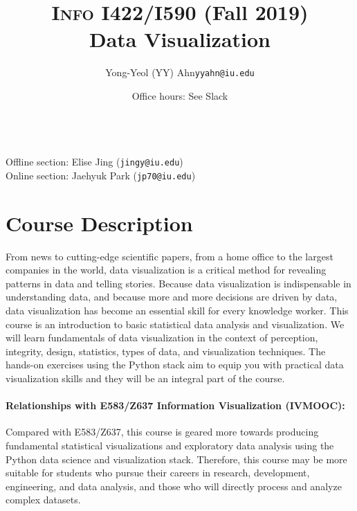 \documentclass[11pt,article,oneside]{memoir} %
\makeatletter
\def\myauthor{Author}
\def\mytitle{Title}
\def\myemail{yyahn@iu.edu}
\def\myauthor{Yong-Yeol (YY) Ahn}
\def\mytitle{{\normalsize \textsc{Info} I422/I590 (Fall 2019)} \\ \HUGE{} Data Visualization}
\makeatother
\begin{document}

\title{\LARGE \mytitle} %
\author{\Large\myauthor\newline \footnotesize\texttt{\noindent\myemail}}

\maketitle 

\vspace{-20pt}{\bfseries Assistant Instructors} \\ %
Offline section: Elise Jing (\texttt{jingy@iu.edu}) \\
Online section: Jaehyuk Park (\texttt{jp70@iu.edu}) \\

\date{Office hours: See Slack}
\section{Course Description}%

From news to cutting-edge scientific papers, from a home office to the largest companies in the world, data visualization is a critical method for revealing patterns in data and telling stories. 
Because data visualization is indispensable in understanding data, and because more and more decisions are driven by data, data visualization has become an essential skill for every knowledge worker.  
This course is an introduction to basic statistical data analysis and visualization.  
We will learn fundamentals of data visualization in the context of perception, integrity, design, statistics, types of data, and visualization techniques.  
The hands-on exercises using the Python stack aim to equip you with practical data visualization skills and they will be an integral part of the course. 

\paragraph{Relationships with E583/Z637 Information Visualization (IVMOOC):}
Compared with E583/Z637, this course is geared more towards producing fundamental statistical visualizations and exploratory data analysis using the Python data science and visualization stack.  
Therefore, this course may be more suitable for students who pursue their careers in research, development, engineering, and data analysis, and those who will directly process and analyze complex datasets. 
\end{document}
